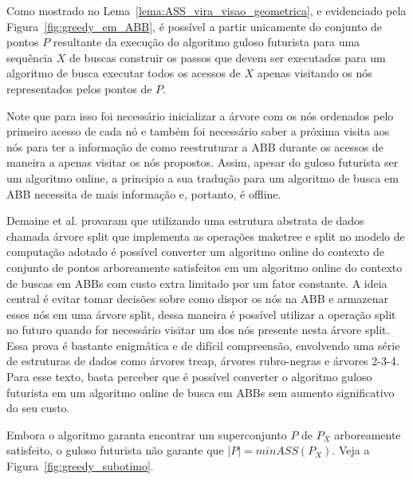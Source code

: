 Como mostrado no Lema~\ref{lema:ASS_vira_visao_geometrica}, e evidenciado pela Figura~\ref{fig:greedy_em_ABB}, é possível a partir unicamente do conjunto de pontos $P$ resultante da execução do algoritmo guloso futurista para uma sequência $X$ de buscas construir os passos que devem ser executados para um algoritmo de busca executar todos os acessos de $X$ apenas visitando os nós representados pelos pontos de $P$. 

Note que para isso foi necessário inicializar a árvore com os nós ordenados pelo primeiro acesso de cada nó e também foi necessário saber a próxima visita aos nós para ter a informação de como reestruturar a ABB durante os acessos de maneira a apenas visitar os nós propostos. Assim, apesar do guloso futurista ser um algoritmo online, a principio a sua tradução para um algoritmo de busca em ABB necessita de mais informação e, portanto, é offline.

Demaine et al. \cite{geometry_of_bst} provaram que utilizando uma estrutura abstrata de dados chamada árvore split que implementa as operações maketree e split no modelo de computação adotado é possível converter um algoritmo online do contexto de conjunto de pontos arboreamente satisfeitos em um algoritmo online do contexto de buscas em ABBs com custo extra limitado por um fator constante. A ideia central é evitar tomar decisões sobre como dispor os nós na ABB e armazenar esses nós em uma árvore split, dessa maneira é possível utilizar a operação split no futuro quando for necessário visitar um dos nós presente nesta árvore split. Essa prova é bastante enigmática e de difícil compreensão, envolvendo uma série de estruturas de dados como árvores treap, árvores rubro-negras e árvores 2-3-4. Para esse texto, basta perceber que é possível converter o algoritmo guloso futurista em um algoritmo online de busca em ABBs sem aumento significativo do seu custo.

Embora o algoritmo garanta encontrar um superconjunto $P$ de $P_X$ arboreamente satisfeito, o guloso futurista não garante que $|P| = minASS(P_X)$. Veja a Figura~\ref{fig:greedy_subotimo}.

